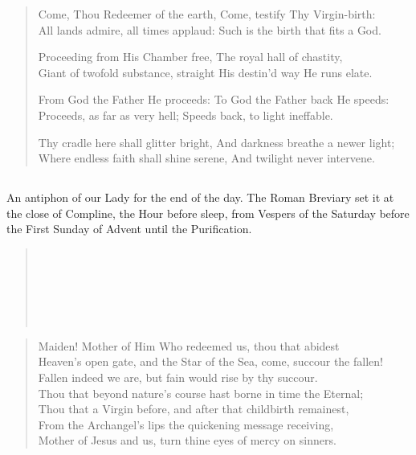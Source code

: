 \begin{verse}
Come, Thou Redeemer of the earth, Come, testify Thy Virgin-birth: \\
All lands admire, all times applaud: Such is the birth that fits a God.

Proceeding from His Chamber free, The royal hall of chastity, \\
Giant of twofold substance, straight His destin'd way He runs elate.

From God the Father He proceeds: To God the Father back He speeds: \\
Proceeds, as far as very hell; Speeds back, to light ineffable.

Thy cradle here shall glitter bright, And darkness breathe a newer light; \\
Where endless faith shall shine serene, And twilight never intervene.
\end{verse}

\subsection{}

An antiphon of our Lady for the end of the day. The Roman Breviary set it
at the close of Compline, the Hour before sleep, from Vespers of the Saturday
before the First Sunday of Advent until the Purification.

\begin{verse}
 \\
 \\
 \\
 \\
 \\
\end{verse}

\begin{verse}
Maiden! Mother of Him Who redeemed us, thou that abidest \\
Heaven’s open gate, and the Star of the Sea, come, succour the fallen! \\
Fallen indeed we are, but fain would rise by thy succour. \\
Thou that beyond nature’s course hast borne in time the Eternal; \\
Thou that a Virgin before, and after that childbirth remainest, \\
From the Archangel’s lips the quickening message receiving, \\
Mother of Jesus and us, turn thine eyes of mercy on sinners.
\end{verse}

